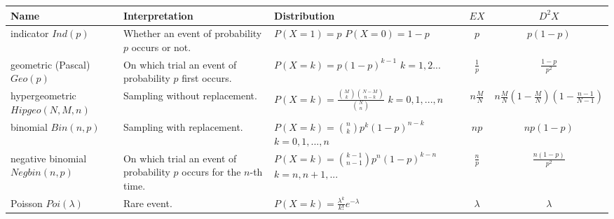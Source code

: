 \documentclass[margin=0px]{article}
\begin{document}
\begin{tabular}{|p{2.5cm}|p{4cm}|p{4cm}|c|c|}
    \hline \textbf{Name}                              & \textbf{Interpretation}                                                     & \textbf{Distribution}                                                                      & \textbf{$EX$}   & \textbf{$D^{2}X$}                                     \\
    \hline indicator \newline $Ind(p)$               & Whether an event of probability $p$ occurs or not.                  & $P(X=1) = p$ \newline $P(X=0) = 1-p$                                                   & $p$             & $p(1-p)$                                              \\
    \hline geometric (Pascal) \newline $Geo(p)$     & On which trial an event of probability $p$ first occurs.         & $P(X=k) = p(1-p)^{k-1}$ \newline $k=1,2...$                                            & $\frac{1}{p}$   & $\frac{1-p}{p^2}$                                     \\
    \hline hypergeometric \newline $Hipgeo(N,M,n)$  & Sampling without replacement.                                         & $P(X=k) = \frac{{M \choose k}{N-M \choose n-k}}{{N \choose n}}$ \newline $k=0,1,...,n$ & $n \frac{M}{N}$ & $n \frac{M}{N}(1 - \frac{M}{N})(1 - \frac{n-1}{N-1})$ \\
    \hline binomial \newline $Bin(n,p)$            & Sampling with replacement.                                               & $P(X=k) = {n \choose k}p^{k}(1-p)^{n-k}$ \newline $k=0,1,...,n$                        & $np$            & $np(1-p)$                                             \\
    \hline negative binomial \newline $Negbin(n,p)$ & On which trial an event of probability $p$ occurs for the $n$-th time. & $P(X=k) = {k-1 \choose n-1}p^{n}(1-p)^{k-n}$ \newline $k=n,n+1,...$                    & $\frac{n}{p}$   & $\frac{n(1-p)}{p^{2}}$                                \\
    \hline Poisson \newline $Poi(\lambda)$           & Rare event.                                                          & $P(X=k) = \frac{\lambda^k}{k!}e^{-\lambda}$                                            & $\lambda$       & $\lambda$                                             \\
    \hline
\end{tabular}
\end{document}
